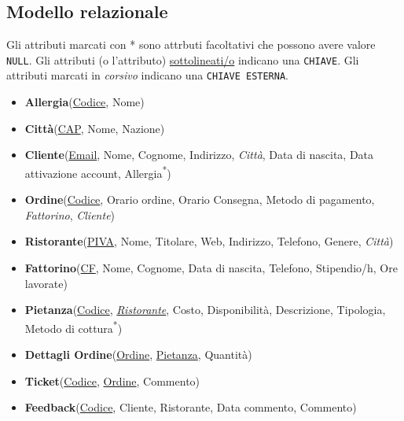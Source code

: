 \documentclass[10pt]{article}
\begin{document}
		\subsection{Modello relazionale}
		\begin{framed}
		\noindent Gli attributi marcati con * sono attrbuti facoltativi che possono avere valore \texttt{\color{blue}NULL}. \newline
		Gli attributi (o l'attributo) \underline{sottolineati/o} indicano una \texttt{CHIAVE}. \newline
		Gli attributi marcati in \textit{corsivo} indicano una \texttt{CHIAVE ESTERNA}.
		\end{framed}
		\begin{itemize}[noitemsep]
			\item[] \textbf{Allergia}(\underline{Codice}, Nome)
			\item[] \textbf{Citt\`a}(\underline{CAP}, Nome, Nazione)
			\item[] \textbf{Cliente}(\underline{Email}, Nome, Cognome, Indirizzo, \textit{Citt\`a}, Data di nascita, Data attivazione account, Allergia\textsuperscript{*})
			\item[] \textbf{Ordine}(\underline{Codice}, Orario ordine, Orario Consegna, Metodo di pagamento, \textit{Fattorino}, \textit{Cliente})
			\item[] \textbf{Ristorante}(\underline{PIVA}, Nome, Titolare, Web, Indirizzo, Telefono, Genere, \textit{Citt\`a})
			\item[] \textbf{Fattorino}(\underline{CF}, Nome, Cognome, Data di nascita, Telefono, Stipendio/h, Ore lavorate)			
			\item[] \textbf{Pietanza}(\underline{Codice}, \underline{\textit{Ristorante}}, Costo, Disponibilit\`a, Descrizione, Tipologia, Metodo di cottura\textsuperscript{*})
			\item[] \textbf{Dettagli Ordine}(\underline{Ordine}, \underline{Pietanza}, Quantit\`a)
			\item[] \textbf{Ticket}(\underline{Codice}, \underline{Ordine}, Commento)
			\item[] \textbf{Feedback}(\underline{Codice}, Cliente, Ristorante, Data commento, Commento)
		\end{itemize}
\end{document}
